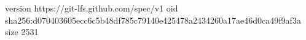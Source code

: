 version https://git-lfs.github.com/spec/v1
oid sha256:d070403605ecc6c5b48df785c79140e425478a2434260a17ae46d0ca49f9af3a
size 2531
